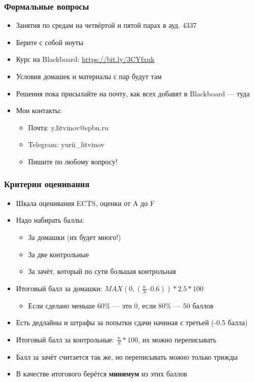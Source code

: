 \documentclass{../../slides-style}
\begin{document}
    \begin{frame}[plain]
        \titlepage
    \end{frame}

    \begin{frame}
        \frametitle{Формальные вопросы}
        \begin{itemize}
            \item Занятия по средам на четвёртой и пятой парах в ауд. 4337
            \item Берите с собой ноуты
            \item Курс на Blackboard: \url{https://bit.ly/3CYfxuk}
            \item Условия домашек и материалы с пар будут там
            \item Решения пока присылайте на почту, как всех добавят в Blackboard --- туда
            \item Мои контакты:
            \begin{itemize}
                \item Почта: y.litvinov@spbu.ru
                \item Telegram: yurii\_litvinov
                \item Пишите по любому вопросу!
            \end{itemize}
        \end{itemize}
    \end{frame}

    \begin{frame}
        \frametitle{Критерии оценивания}
        \begin{itemize}
            \item Шкала оценивания ECTS, оценки от A до F
            \item Надо набирать баллы:
            \begin{itemize}
                \item За домашки (их будет много!)
                \item За две контрольные
                \item За зачёт, который по сути большая контрольная
            \end{itemize}
            \item Итоговый балл за домашки: $MAX(0, (\frac{n}{N} – 0.6)) * 2.5 * 100$
            \begin{itemize}
                \item Если сделано меньше 60\% --- это 0, если 80\% --- 50 баллов
            \end{itemize}
            \item Есть дедлайны и штрафы за попытки сдачи начиная с третьей (-0.5 балла)
            \item Итоговый балл за контрольные: $\frac{n}{N} * 100$, их можно переписывать
            \item Балл за зачёт считается так же, но переписывать можно только трижды
            \item В качестве итогового берётся \textbf{минимум} из этих баллов
        \end{itemize}
    \end{frame}
\end{document}
